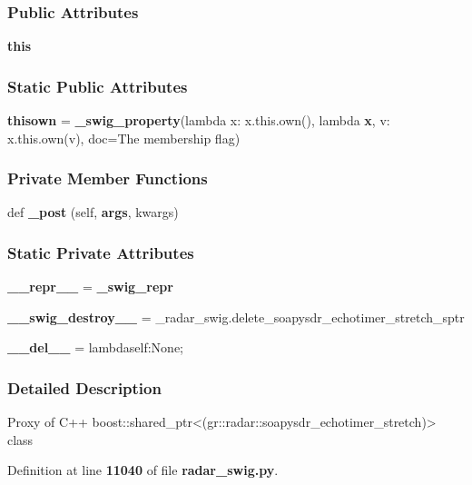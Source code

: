 \subsubsection*{Public Attributes}
\begin{DoxyCompactItemize}
\item 
{\bf this}
\end{DoxyCompactItemize}
\subsubsection*{Static Public Attributes}
\begin{DoxyCompactItemize}
\item 
{\bf thisown} = {\bf \+\_\+swig\+\_\+property}(lambda x\+: x.\+this.\+own(), lambda {\bf x}, v\+: x.\+this.\+own(v), doc=\textquotesingle{}The membership flag\textquotesingle{})
\end{DoxyCompactItemize}
\subsubsection*{Private Member Functions}
\begin{DoxyCompactItemize}
\item 
def {\bf \+\_\+post} (self, {\bf args}, kwargs)
\end{DoxyCompactItemize}
\subsubsection*{Static Private Attributes}
\begin{DoxyCompactItemize}
\item 
{\bf \+\_\+\+\_\+repr\+\_\+\+\_\+} = {\bf \+\_\+swig\+\_\+repr}
\item 
{\bf \+\_\+\+\_\+swig\+\_\+destroy\+\_\+\+\_\+} = \+\_\+radar\+\_\+swig.\+delete\+\_\+soapysdr\+\_\+echotimer\+\_\+stretch\+\_\+sptr
\item 
{\bf \+\_\+\+\_\+del\+\_\+\+\_\+} = lambdaself\+:\+None;
\end{DoxyCompactItemize}


\subsubsection{Detailed Description}
\begin{DoxyVerb}Proxy of C++ boost::shared_ptr<(gr::radar::soapysdr_echotimer_stretch)> class\end{DoxyVerb}
 

Definition at line {\bf 11040} of file {\bf radar\+\_\+swig.\+py}.




